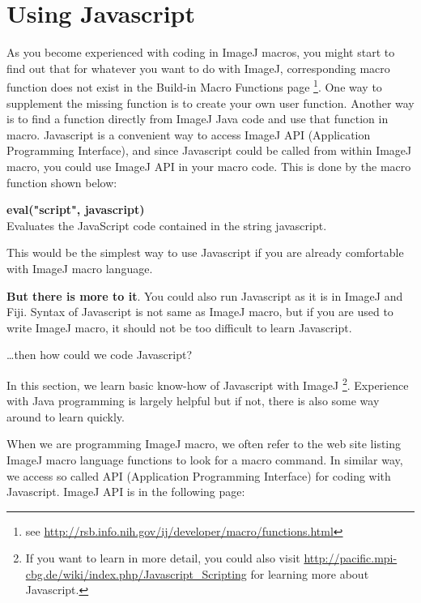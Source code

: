 \documentclass[11pt,a4paper,oneside]{report}
\newenvironment{indentCom}%
{\begin{list}{}%
         {\setlength{\leftmargin}{1em}}%
         \item[]%
}
{\end{list}}
\begin{document}
\newpage

\section{Using Javascript}

As you become experienced with coding in ImageJ macros, you might start to find
out that for whatever you want to do with ImageJ, 
corresponding macro function does not exist in the Build-in Macro Functions page
\footnote{ see \url{http://rsb.info.nih.gov/ij/developer/macro/functions.html}}. 
One way to supplement the missing function is to create your own user function. 
Another way is to find a function directly from ImageJ Java code and use that function in macro. 
Javascript is a convenient way to access ImageJ API (Application Programming Interface), 
and since Javascript could be called from within ImageJ macro, you could use ImageJ API in your macro code. 
This is done by the macro function shown below:
\begin{shaded}
\begin{indentCom}
\item \textbf{eval("script", javascript)}\\
Evaluates the JavaScript code contained in the string javascript.\\
\end{indentCom}
\end{shaded}

This would be the simplest way to use Javascript if you are already
comfortable with ImageJ macro language. 

\textbf{But there is more to it}. You could also run Javascript as it is in
ImageJ and Fiji. Syntax of Javascript is not same as ImageJ macro, 
but if you are used to write ImageJ macro, it should not be too difficult to learn Javascript.  
 
\dots then how could we code Javascript? 

In this section, we learn basic know-how of 
Javascript with ImageJ 
\footnote{ If you want to learn in more detail, 
you could also visit \url{http://pacific.mpi-cbg.de/wiki/index.php/Javascript_Scripting} 
for learning more about Javascript.}. Experience with 
Java programming is largely helpful but if not, there is also some way around
to learn quickly. 

When we are programming ImageJ macro, we often refer to the
web site listing ImageJ macro language functions to look for a macro command. 
In similar way, we access so called API (Application Programming Interface) 
for coding with Javascript. ImageJ API is in the following page:
\end{document}
